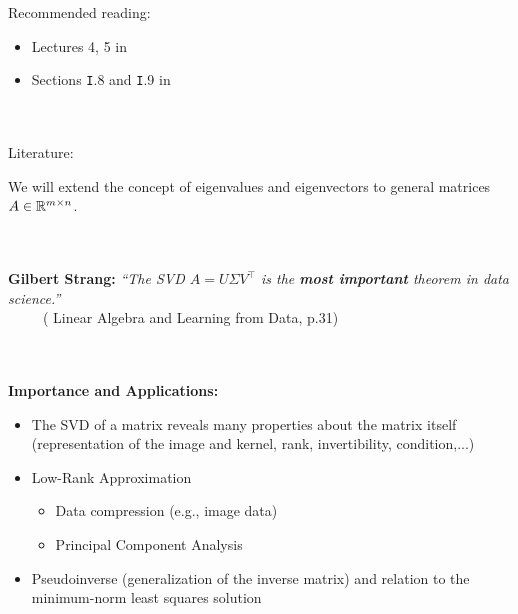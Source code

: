 
\begin{frame}
	Recommended reading:
	\begin{itemize}
		\item Lectures 4, 5 in \cite{TreBau}
		\item Sections \texttt{I}.8 and \texttt{I}.9 in \cite{StrangData}
	\end{itemize}
	
	~\\~\\
	Literature:\\
	
\end{frame}


\begin{frame}
We will extend the concept of eigenvalues and eigenvectors to general matrices $A \in {\mathbb{R}}^{m\times n}$.\\~\\
~\\
\begin{center}
	\textbf{Gilbert Strang:} \textit{``The SVD $A=U\Sigma V^\top$ is the \textbf{most important} theorem in data science.''} \\{\small ~~~~~(\cite{StrangData} Linear Algebra and Learning from Data, p.31)}\\[0.3cm] 
\end{center}
~\\~\\
\textbf{Importance and Applications:}\\
\begin{itemize}
	\item The SVD of a matrix reveals many properties about the matrix itself (representation of the image and kernel, rank, invertibility, condition,...)
	\vspace{0.2cm}\item Low-Rank Approximation
	\begin{itemize}
	\vspace{0.2cm}\item Data compression (e.g., image data)
\vspace{0.2cm}\item Principal Component Analysis 
	\end{itemize}
	\vspace{0.2cm}\item Pseudoinverse (generalization of the inverse matrix) and relation to the minimum-norm least squares solution
\end{itemize}
\end{frame}

